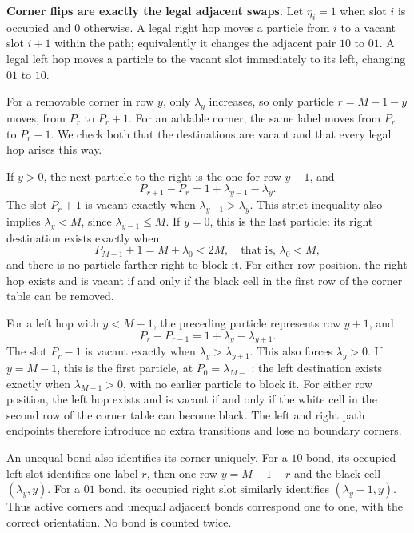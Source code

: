 \documentclass[
  11pt,
  a4paper,
]{article}
\begin{document}
\textbf{Corner flips are exactly the legal adjacent swaps.} Let
\(\eta_i=1\) when slot \(i\) is occupied and \(0\) otherwise. A legal
right hop moves a particle from \(i\) to a vacant slot \(i+1\) within
the path; equivalently it changes the adjacent pair \(10\) to \(01\). A
legal left hop moves a particle to the vacant slot immediately to its
left, changing \(01\) to \(10\).

For a removable corner in row \(y\), only \(\lambda_y\) increases, so
only particle \(r=M-1-y\) moves, from \(P_r\) to \(P_r+1\). For an
addable corner, the same label moves from \(P_r\) to \(P_r-1\). We check
both that the destinations are vacant and that every legal hop arises
this way.

If \(y>0\), the next particle to the right is the one for row \(y-1\),
and \[
P_{r+1}-P_r=1+\lambda_{y-1}-\lambda_y.
\] The slot \(P_r+1\) is vacant exactly when
\(\lambda_{y-1}>\lambda_y\). This strict inequality also implies
\(\lambda_y<M\), since \(\lambda_{y-1}\leq M\). If \(y=0\), this is the
last particle: its right destination exists exactly when \[
P_{M-1}+1=M+\lambda_0<2M,
\quad\text{that is, }\lambda_0<M,
\] and there is no particle farther right to block it. For either row
position, the right hop exists and is vacant if and only if the black
cell in the first row of the corner table can be removed.

For a left hop with \(y<M-1\), the preceding particle represents row
\(y+1\), and \[
P_r-P_{r-1}=1+\lambda_y-\lambda_{y+1}.
\] The slot \(P_r-1\) is vacant exactly when
\(\lambda_y>\lambda_{y+1}\). This also forces \(\lambda_y>0\). If
\(y=M-1\), this is the first particle, at \(P_0=\lambda_{M-1}\): the
left destination exists exactly when \(\lambda_{M-1}>0\), with no
earlier particle to block it. For either row position, the left hop
exists and is vacant if and only if the white cell in the second row of
the corner table can become black. The left and right path endpoints
therefore introduce no extra transitions and lose no boundary corners.

An unequal bond also identifies its corner uniquely. For a \(10\) bond,
its occupied left slot identifies one label \(r\), then one row
\(y=M-1-r\) and the black cell \((\lambda_y,y)\). For a \(01\) bond, its
occupied right slot similarly identifies \((\lambda_y-1,y)\). Thus
active corners and unequal adjacent bonds correspond one to one, with
the correct orientation. No bond is counted twice.
\end{document}
